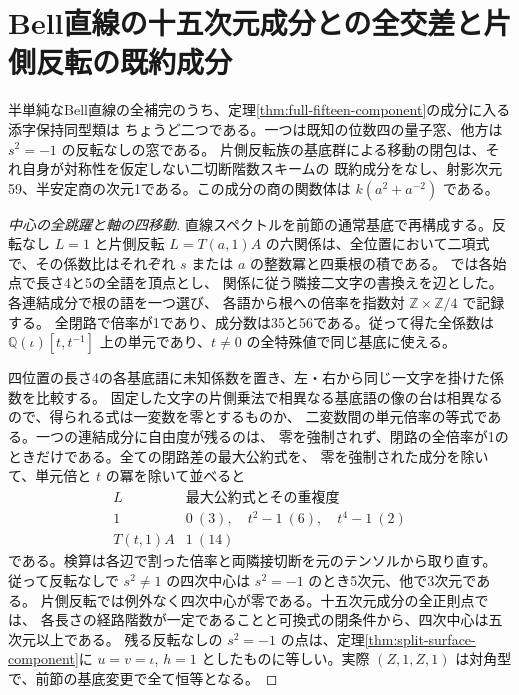 \section{Bell直線の十五次元成分との全交差と片側反転の既約成分}
\label{sec:split-line-component-incidence}
\begin{theorem}\label{thm:split-line-component-incidence}
半単純なBell直線の全補完のうち、定理\ref{thm:full-fifteen-component}の成分に入る添字保持同型類は
ちょうど二つである。一つは既知の位数四の量子窓、他方は $s^2=-1$ の反転なしの窓である。
片側反転族の基底群による移動の閉包は、それ自身が対称性を仮定しない二切断階数スキームの
既約成分をなし、射影次元59、半安定商の次元1である。この成分の商の関数体は $k(a^2+a^{-2})$ である。
\end{theorem}
\begin{proof}[中心の全跳躍と軸の四移動]
直線スペクトルを前節の通常基底で再構成する。反転なし $L=1$ と片側反転
$L=T(a,1)A$ の六関係は、全位置において二項式で、その係数比はそれぞれ
$s$ または $a$ の整数冪と四乗根の積である。
 では各始点で長さ4と5の全語を頂点とし、
関係に従う隣接二文字の書換えを辺とした。各連結成分で根の語を一つ選び、
各語から根への倍率を指数対 $\mathbb Z\times\mathbb Z/4$ で記録する。
全閉路で倍率が1であり、成分数は35と56である。従って得た全係数は
$\mathbb Q(\iota)[t,t^{-1}]$ 上の単元であり、$t\ne0$ の全特殊値で同じ基底に使える。

四位置の長さ4の各基底語に未知係数を置き、左・右から同じ一文字を掛けた係数を比較する。
固定した文字の片側乗法で相異なる基底語の像の台は相異なるので、得られる式は一変数を零とするものか、
二変数間の単元倍率の等式である。一つの連結成分に自由度が残るのは、
零を強制されず、閉路の全倍率が1のときだけである。全ての閉路差の最大公約式を、
零を強制された成分を除いて、単元倍と $t$ の冪を除いて並べると
\[
\begin{array}{c|c}
 L & \text{最大公約式とその重複度}\\\hline
 1 & 0\ (3),\quad t^2-1\ (6),\quad t^4-1\ (2)\\
 T(t,1)A & 1\ (14)
\end{array}
\]
である。検算は各辺で割った倍率と両隣接切断を元のテンソルから取り直す。
従って反転なしで $s^2\ne1$ の四次中心は $s^2=-1$ のとき5次元、他で3次元である。
片側反転では例外なく四次中心が零である。十五次元成分の全正則点では、
各長さの経路階数が一定であることと可換式の閉条件から、四次中心は五次元以上である。
残る反転なしの $s^2=-1$ の点は、定理\ref{thm:split-surface-component}に
$u=v=\iota$, $h=1$ としたものに等しい。実際 $(Z,1,Z,1)$ は対角型で、前節の基底変更で全て恒等となる。


\end{proof}
